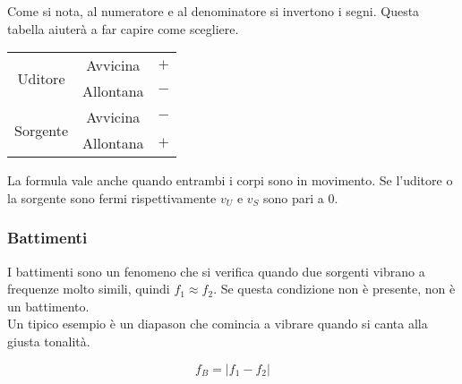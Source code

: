 Come si nota, al numeratore e al denominatore si invertono i segni. Questa tabella aiuterà a far 
capire come scegliere.

\begin{center}
	\begin{tabular}{| c | c | c |}
		\hline
		\multicolumn{1}{|c}{\multirow{2}{*}{Uditore}} & 
			\multicolumn{1}{|c|}{Avvicina} & $+$\\ \cline{2-3}
		\multicolumn{1}{|c}{} &
			\multicolumn{1}{|c|}{Allontana} & $-$\\ 
		\hline\hline
		\multicolumn{1}{|c}{\multirow{2}{*}{Sorgente}} & 
			\multicolumn{1}{|c|}{Avvicina} & $-$\\ \cline{2-3}
		\multicolumn{1}{|c}{} &
			\multicolumn{1}{|c|}{Allontana} & $+$\\
		\hline 
	\end{tabular}
\end{center}

La formula vale anche quando entrambi i corpi sono in movimento. Se l'uditore o la sorgente sono fermi
rispettivamente $v_U$ e $v_S$ sono pari a $0$.

\subsubsection{Battimenti}
I battimenti sono un fenomeno che si verifica quando due sorgenti vibrano a frequenze molto simili,
quindi $f_1 \approx f_2$. Se questa condizione non è presente, non è un battimento.\\
Un tipico esempio è un diapason che comincia a vibrare quando si canta alla giusta tonalità.

\begin{equation*}
f_B = \left\vert f_1 - f_2 \right\vert
\end{equation*}
